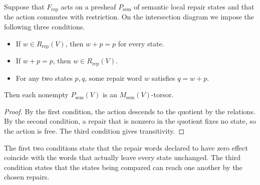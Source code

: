 \begin{proposition}\label{prop:2.44}

Suppose that $F_{\mathrm{rep}}$ acts on a presheaf $P_{\mathrm{sem}}$ of semantic local
repair states and that the action commutes with restriction. On the intersection diagram
we impose the following three conditions.

\begin{itemize}
\item If $w\in R_{\mathrm{rep}}(V)$, then $w+p=p$ for every state.
\item If $w+p=p$, then $w\in R_{\mathrm{rep}}(V)$.
\item For any two states $p,q$, some repair word $w$ satisfies $q=w+p$.
\end{itemize}

Then each nonempty $P_{\mathrm{sem}}(V)$ is an $M_{\mathrm{sem}}(V)$-torsor.

\end{proposition}

\begin{proof}

By the first condition, the action descends to the quotient by the relations. By the
second condition, a repair that is nonzero in the quotient fixes no state, so the action
is free. The third condition gives transitivity.

\end{proof}

The first two conditions state that the repair words declared to have zero effect
coincide with the words that actually leave every state unchanged. The third condition
states that the states being compared can reach one another by the chosen repairs.

